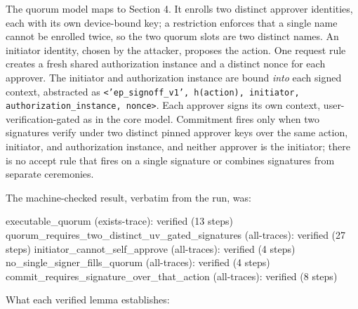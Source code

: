 \documentclass[11pt]{article}
\newcommand{\code}[1]{\texttt{#1}}
\begin{document}
The quorum model maps to Section 4. It enrolls two distinct approver identities,
each with its own device-bound key; a restriction enforces that a single name
cannot be enrolled twice, so the two quorum slots are two distinct names. An
initiator identity, chosen by the attacker, proposes the action. One request rule
creates a fresh shared authorization instance and a distinct nonce for each
approver. The initiator and authorization instance are bound \emph{into} each
signed context, abstracted as
\code{<'ep\_signoff\_v1', h(action), initiator, authorization\_instance, nonce>}.
Each approver signs its own context, user-verification-gated as in the core model.
Commitment fires only when two signatures verify under two distinct pinned
approver keys over the same action, initiator, and authorization instance, and
neither approver is the initiator; there is no accept rule that fires on a single
signature or combines signatures from separate ceremonies.

The machine-checked result, verbatim from the run, was:

\begin{tool}
executable_quorum (exists-trace): verified (13 steps)
quorum_requires_two_distinct_uv_gated_signatures (all-traces): verified (27 steps)
initiator_cannot_self_approve (all-traces): verified (4 steps)
no_single_signer_fills_quorum (all-traces): verified (4 steps)
commit_requires_signature_over_that_action (all-traces): verified (8 steps)
\end{tool}

What each verified lemma establishes:
\end{document}
